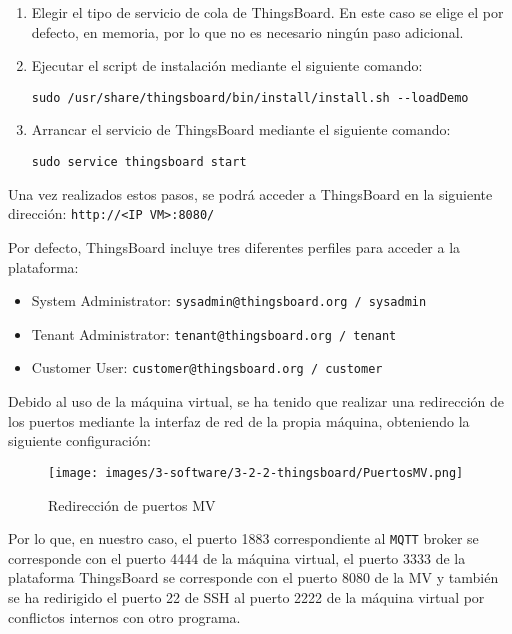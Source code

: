 \begin{enumerate}
    \item Elegir el tipo de servicio de cola de ThingsBoard. En este caso se elige el por defecto, en memoria, por lo que no es necesario ningún paso adicional.

    \item Ejecutar el script de instalación mediante el siguiente comando:
    \begin{verbatim}
sudo /usr/share/thingsboard/bin/install/install.sh --loadDemo
    \end{verbatim}

    \item Arrancar el servicio de ThingsBoard mediante el siguiente comando:
    \begin{verbatim}
sudo service thingsboard start
    \end{verbatim}
\end{enumerate}

Una vez realizados estos pasos, se podrá acceder a ThingsBoard en la siguiente dirección: \texttt{http://<IP VM>:8080/}

Por defecto, ThingsBoard incluye tres diferentes perfiles para acceder a la plataforma:
\begin{itemize}
    \item System Administrator: \texttt{sysadmin@thingsboard.org / sysadmin}
    \item Tenant Administrator: \texttt{tenant@thingsboard.org / tenant}
    \item Customer User: \texttt{customer@thingsboard.org / customer}
\end{itemize}

Debido al uso de la máquina virtual, se ha tenido que realizar una redirección de los puertos mediante la interfaz de red de la propia máquina, obteniendo la siguiente configuración:

\begin{figure}[H]
    \centering
    \texttt{[image: images/3-software/3-2-2-thingsboard/PuertosMV.png]}
    \caption{Redirección de puertos MV}
    \label{fig:3-2-2-PuertosMV}
\end{figure}

Por lo que, en nuestro caso, el puerto 1883 correspondiente al \texttt{MQTT} broker se corresponde con el puerto 4444 de la máquina virtual, el puerto 3333 de la plataforma ThingsBoard se corresponde con el puerto 8080 de la MV y también se ha redirigido el puerto 22 de SSH al puerto 2222 de la máquina virtual por conflictos internos con otro programa.

